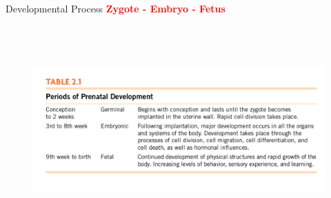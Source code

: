 \documentclass{beamer} %
\begin{document}
\begin{frame}{Developmental Process}
\textcolor{red}{\textbf{Zygote - Embryo - Fetus}}
\begin{figure}
    \includegraphics[width=\textwidth, height=8cm, keepaspectratio]{1.png}
\end{figure}
\end{frame}
\end{document}
